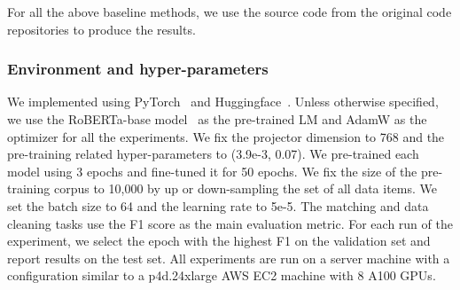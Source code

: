 

For all the above baseline methods, we use the source code from the original code repositories to produce the results.










\subsubsection{Environment and hyper-parameters}

We implemented \system using PyTorch~\cite{DBLP:conf/nips/PaszkeGMLBCKLGA19} and Huggingface~\cite{DBLP:conf/emnlp/WolfDSCDMCRLFDS20}.
Unless otherwise specified, 
we use the RoBERTa-base model~\cite{DBLP:journals/corr/abs-1907-11692} as the pre-trained LM and AdamW as the optimizer for all the experiments.
We fix the projector dimension to 768 and the pre-training related 
hyper-parameters  to (3.9e-3, 0.07).
We pre-trained each model using 3 epochs and fine-tuned it for 50 epochs. We fix the size of the pre-training corpus to 10,000
by up or down-sampling the set of all data items.
We set the batch size to 64 and the learning rate to 5e-5.
The matching and data cleaning tasks use the F1 score as the main evaluation metric. 
For each run of the experiment, we select the epoch with the highest F1 on the validation set and report results on the test set.
All experiments are run on a server machine with a configuration similar to 
a p4d.24xlarge AWS EC2 machine with 8 A100 GPUs.


